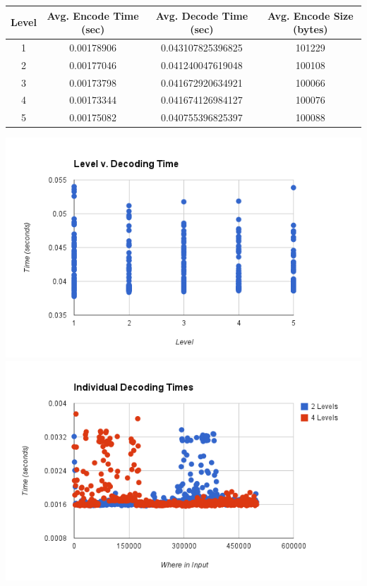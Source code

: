\documentclass{article}
\begin{document}
\begin{center}\smallskip
    \begin{tabular}{ | c | c | c | c |}
    \hline
    Level & Avg. Encode Time (sec) & Avg. Decode Time (sec) & Avg. Encode Size (bytes) \\ \hline
    1 & 0.00178906 & 0.043107825396825 & 101229\\
    2 & 0.00177046 & 0.041240047619048 & 100108\\
    3 & 0.00173798 & 0.041672920634921 & 100066\\
    4 & 0.00173344 & 0.041674126984127 & 100076\\
    5 & 0.00175082 & 0.040755396825397 & 100088\\ \hline
    \end{tabular}
\end{center}

\includegraphics[scale=0.4]{images/betterlevel_v_decode}
\includegraphics[scale=0.4]{images/individual_decodetime}
\afterpage{\vfill}
\end{document}
